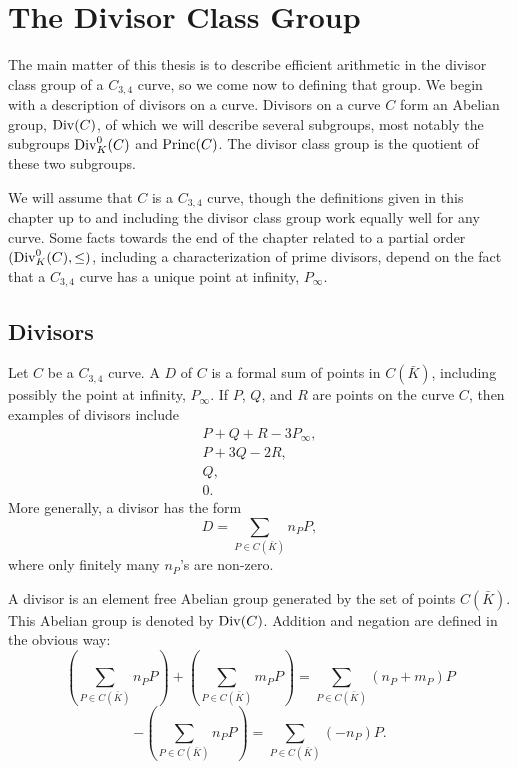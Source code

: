 
\section{The Divisor Class Group}
\label{chap_divisors}

The main matter of this thesis is to describe efficient arithmetic in the divisor class group of a $C_{3,4}$ curve,
so we come now to defining that group.
We begin with a description of divisors on a curve.
Divisors on a curve $C$ form an Abelian group, $\operatorname{Div}(C)$, of which we will describe several subgroups,
most notably the subgroups $\operatorname{Div}_K^0(C)$ and $\operatorname{Princ}(C)$.
The divisor class group is the quotient of these two subgroups.

We will assume that $C$ is a $C_{3,4}$ curve,
though the definitions given in this chapter up to and including the divisor class group
work equally well for any curve.
Some facts towards the end of the chapter related to a partial order $(\operatorname{Div}_K^0(C), \leq)$,
including a characterization of prime divisors,
depend on the fact that a $C_{3,4}$ curve has a unique point at infinity, $P_{\infty}$.



\subsection{Divisors}

Let $C$ be a $C_{3,4}$ curve.
A  $D$ of $C$ is a formal sum of points in $C(\bar K)$,
including possibly the point at infinity, $P_\infty$.
If $P$, $Q$, and $R$ are points on the curve $C$, then examples of divisors include
  \[ \begin{array}{c} P + Q + R - 3P_\infty, \\ P + 3Q - 2R, \\ Q, \\ 0. \end{array} \]
More generally, a divisor has the form
  \[ D = \sum_{P \in C(\bar K)} n_P P,\]
where only finitely many $n_P$'s are non-zero.

A divisor is an element free Abelian group generated by the set of points $C(\bar K)$.
This Abelian group is denoted by $\operatorname{Div}(C)$.
Addition and negation are defined in the obvious way:
\[ \left( \sum_{P \in C(\bar K)} n_P P \right) + \left( \sum_{P \in C(\bar K)} m_P P \right) = \sum_{P \in C(\bar K)} (n_P + m_P) P \]
\[ -\left( \sum_{P \in C(\bar K)} n_P P \right) = \sum_{P \in C(\bar K)} (-n_P) P. \]

